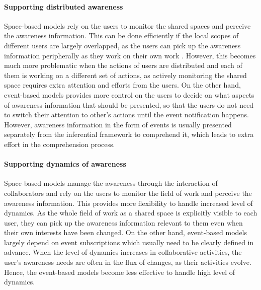 \paragraph*{Supporting distributed awareness} %
\label{par:supporting_distributed_awareness}
Space-based models rely on the users to monitor the shared spaces and perceive the awareness information. This can be done efficiently if the local scopes of different users are largely overlapped, as the users can pick up the awareness information peripherally as they work on their own work \cite{schmidt2002a}. However, this becomes much more problematic when the actions of users are distributed and each of them is working on a different set of actions, as actively monitoring the shared space requires extra attention and efforts from the users. On the other hand, event-based models provides more control on the users to decide on what aspects of awareness information that should be presented, so that the users do not need to switch their attention to other's actions until the event notification happens. However, awareness information in the form of events is usually presented separately from the inferential framework to comprehend it, which leads to extra effort in the comprehension process.

\paragraph*{Supporting dynamics of awareness} %
\label{par:supporting_dynamics_of_awareness}
Space-based models manage the awareness through the interaction of collaborators and rely on the users to monitor the field of work and perceive the awareness information. This provides more flexibility to handle increased level of dynamics. As the whole field of work as a shared space is explicitly visible to each user, they can pick up the awareness information relevant to them even when their own interests have been changed. On the other hand, event-based models largely depend on event subscriptions which usually need to be clearly defined in advance. When the level of dynamics increases in collaborative activities, the user's awareness needs are often in the flux of changes, as their activities evolve. Hence, the event-based models become less effective to handle high level of dynamics.

